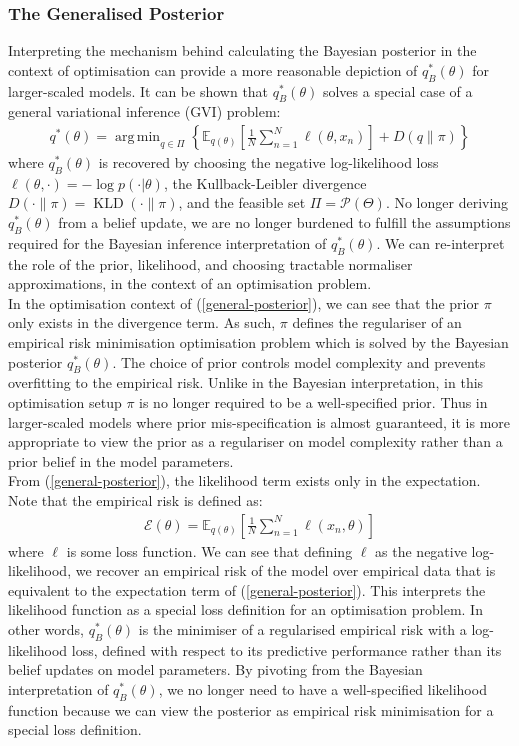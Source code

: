 \documentclass{article}
\newcommand{\KLD}{\operatorname{KLD}}
\DeclareMathOperator*{\argmin}{arg\,min}
\numberwithin{equation}{section}
\begin{document}
\subsubsection{The Generalised Posterior}
Interpreting the mechanism behind calculating the Bayesian posterior in the context of optimisation can provide a more reasonable depiction of $q_B^*(\theta)$ for larger-scaled models. It can be shown that $q_B^*(\theta)$ solves a special case of a general variational inference (GVI) problem:
\begin{align}
q^*(\theta) = \argmin_{q \in \Pi} \left\{ \mathbb{E}_{q(\theta)}\left[\frac{1}{N}\sum_{n=1}^N \ell(\theta, x_n)\right] + D(q\|\pi)\right\}
\label{general-posterior}
\end{align}
where $q_B^*(\theta)$ is recovered by choosing the negative log-likelihood loss $\ell(\theta, \cdot) = -\log p(\cdot | \theta)$, the Kullback-Leibler divergence $D(\cdot \| \pi) = \KLD(\cdot \| \pi)$, and the feasible set $\Pi = \mathcal{P}(\Theta)$. No longer deriving $q_B^*(\theta)$ from a belief update, we are no longer burdened to fulfill the assumptions required for the Bayesian inference interpretation of $q_B^*(\theta)$. We can re-interpret the role of the prior, likelihood, and choosing tractable normaliser approximations, in the context of an optimisation problem.
\\In the optimisation context of (\ref{general-posterior}), we can see that the prior $\pi$ only exists in the divergence term. As such, $\pi$ defines the regulariser of an empirical risk minimisation optimisation problem which is solved by the Bayesian posterior $q_B^*(\theta)$. The choice of prior controls model complexity and prevents overfitting to the empirical risk. Unlike in the Bayesian interpretation, in this optimisation setup $\pi$ is no longer required to be a well-specified prior. Thus in larger-scaled models where prior mis-specification is almost guaranteed, it is more appropriate to view the prior as a regulariser on model complexity rather than a prior belief in the model parameters.
\\From (\ref{general-posterior}), the likelihood term exists only in the expectation. Note that the empirical risk is defined as:
\begin{align}
\mathcal{E}(\theta) = \mathbb{E}_{q(\theta)}\left[\frac{1}{N}\sum_{n=1}^N \ell\left(x_n, \theta\right)\right]
\label{empirical-risk}
\end{align}
where $\ell$ is some loss function. We can see that defining $\ell$ as the negative log-likelihood, we recover an empirical risk of the model over empirical data that is equivalent to the expectation term of (\ref{general-posterior}). This interprets the likelihood function as a special loss definition for an optimisation problem. In other words, $q_B^*(\theta)$ is the minimiser of a regularised empirical risk with a log-likelihood loss, defined with respect to its predictive performance rather than its belief updates on model parameters. By pivoting from the Bayesian interpretation of $q_B^*(\theta)$, we no longer need to have a well-specified likelihood function because we can view the posterior as empirical risk minimisation for a special loss definition.
\end{document}
